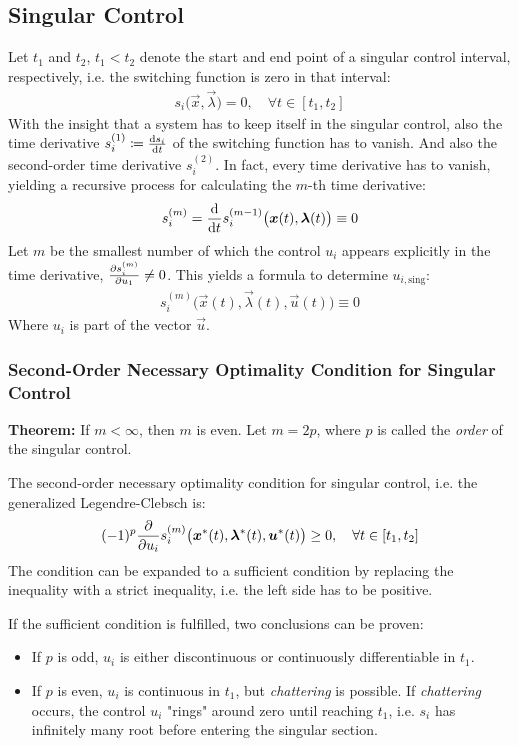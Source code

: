		\subsection{Singular Control}
			Let \(t_1\) and \(t_2\), \( t_1 < t_2 \) denote the start and end point of a singular control interval, respectively, i.e. the switching function is zero in that interval:
			\begin{align*}
				s_i\big(\vec{x}, \vec{\lambda}\big) = 0,\quad \forall t \in [t_1, t_2]
			\end{align*}
			With the insight that a system has to keep itself in the singular control, also the time derivative \( s_i^{(1)} \coloneqq \dv{s_i}{t} \) of the switching function has to vanish. And also the second-order time derivative \( s_i^{(2)} \). In fact, every time derivative has to vanish, yielding a recursive process for calculating the \(m\)-th time derivative:
			\begin{align*}
				s_i^{(m)} = \dv{t} s_i^{(m - 1)}\big(\bm{x}(t), \bm{\lambda}(t)\big) \equiv 0
			\end{align*}
			Let \(m\) be the smallest number of which the control \(u_i\) appears explicitly in the time derivative, \( \pdv{s_i^{(m)}}{u_1} \neq 0 \). This yields a formula to determine \( u_{i, \mathrm{sing}} \):
			\begin{align*}
				s_i^{(m)}\big(\vec{x}(t), \vec{\lambda}(t), \vec{u}(t)\big) \equiv 0
			\end{align*}
			Where \( u_i \) is part of the vector \(\vec{u}\).

			\subsubsection{Second-Order Necessary Optimality Condition for Singular Control}
				\textbf{Theorem:} If \( m < \infty \), then \( m \) is even. Let \( m = 2p \), where \(p\) is called the \emph{order} of the singular control.

				The second-order necessary optimality condition for singular control, i.e. the generalized Legendre-Clebsch is:
				\begin{align*}
					(-1)^p \pdv{u_i} s_i^{(m)}\big( \bm{x}^\ast(t), \bm{\lambda}^\ast(t), \bm{u}^\ast(t) \big) \geq 0,\quad \forall t \in [t_1, t_2]
				\end{align*}
				The condition can be expanded to a sufficient condition by replacing the inequality with a strict inequality, i.e. the left side has to be positive.

				If the sufficient condition is fulfilled, two conclusions can be proven:
				\begin{itemize}
					\item If \(p\) is odd, \(u_i\) is either discontinuous or continuously differentiable in \( t_1 \).
					\item If \(p\) is even, \(u_i\) is continuous in \( t_1 \), but \emph{chattering} is possible. If \emph{chattering} occurs, the control \(u_i\) "rings" around zero until reaching \(t_1\), i.e. \(s_i\) has infinitely many root before entering the singular section.
				\end{itemize}

